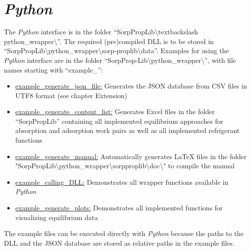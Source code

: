 \section{\textit{Python}}
\label{cha:usage:python}
%
The \textit{Python} interface is in the folder “SorpPropLib\textbackslash textbackslash python\_wrapper\textbackslash ”. The required (pre)compiled DLL is to be stored in “SorpPropLib\textbackslash python\_wrapper\textbackslash sorp-proplib\textbackslash data”. Examples for using the \textit{Python} interface are in the folder “SorpProp-Lib\textbackslash python\_wrapper\textbackslash ”, with file names starting with “example\_”:
\begin{itemize}
	\item \underline{example\_generate\_json\_file:} Generates the JSON database from CSV files in UTF8 format (see chapter Extension)
	\item \underline{example\_generate\_content\_list:} Generates Excel files in the folder “SorpPropLib” containing all implemented equilibrium approaches for absorption and adsorption work pairs as well as all implemented refrigerant functions
	\item \underline{example\_generate\_manual:} Automatically generates LaTeX files in the folder "SorpPropLib\textbackslash python\_wrapper\textbackslash sorpproplib\textbackslash doc\textbackslash " to compile the manual
	\item \underline{example\_calling\_DLL:} Demonstrates all wrapper functions available in \textit{Python}
	\item \underline{example\_generate\_plots:} Demonstrates all implemented functions for visualizing equilibrium data
\end{itemize}
The example files can be executed directly with \textit{Python} because the paths to the DLL and the JSON database are stored as relative paths in the example files.

